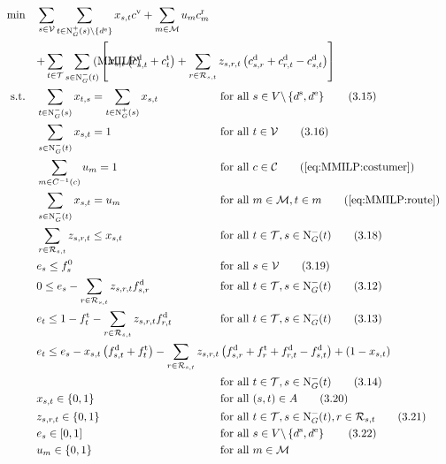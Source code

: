 \begin{align}
	\min \quad & \sum_{s\in\mathcal{V}} \sum_{t\in\Nout(s)\backslash\{d^{\operatorname{e}}\}} x_{s,t}\cv + \sum_{m\in\mathcal{M}} u_m \croute_m \nonumber \\
	& \omit\rlap{$\displaystyle{ + \sum_{t\in\mathcal{T}} \sum_{s\in\Nin(t)} \left[x_{s,t}\left(\cd_{s,t}+\ct_{t}\right) + \sum_{r\in\Rst} z_{s,r,t}\left(\cd_{s,r}+\cd_{r,t}-\cd_{s,t}\right)\right]}$} \tag{MMILP} \label{eq:MMILP} \\
	\text{s.t.} \quad & \sum_{t\in\Nin(s)} x_{t,s} = \sum_{t\in\Nout(s)} x_{s,t} & & \text{for all } s\in V\backslash\left\{d^{\operatorname{s}},d^{\operatorname{e}}\right\} \tag{3.15} \\
	& \sum_{s\in\Nin(t)} x_{s,t} = 1 & & \text{for all } t\in\mathcal{V} \tag{3.16} \\
	& \sum_{m\in C^{-1}(c)} u_m = 1 && \text{for all } c\in\mathcal{C} \tag{\ref{eq:MMILP:costumer}} \\
	& \sum_{s\in\Nin(t)} x_{s,t} = u_m && \text{for all } m\in\mathcal{M}, t\in m \tag{\ref{eq:MMILP:route}} \\
	& \sum_{r\in\Rst} z_{s,r,t} \leq x_{s,t} & & \text{for all } t\in\mathcal{T}, s\in\Nin(t) \tag{3.18} \\
	& e_s \leq f_s^0 & & \text{for all } s\in\mathcal{V} \tag{3.19} \\
	& 0 \leq e_s - \sum_{r\in\Rst} z_{s,r,t}\fd_{s,r} & & \text{for all } t\in\mathcal{T}, s\in\Nin(t) \tag{3.12} \\
	& e_t \leq 1 - \ft_t - \sum_{r\in\Rst} z_{s,r,t}\fd_{r,t} & & \text{for all } t\in\mathcal{T}, s\in\Nin(t) \tag{3.13} \\
	& \omit\rlap{$\displaystyle{e_t \leq e_s - x_{s,t}\left(f_{s,t}^{\operatorname{d}}+f_t^{\operatorname{t}}\right) - \sum_{r\in\Rst} z_{s,r,t}\left(\fd_{s,r}+\ft_r+\fd_{r,t}-\fd_{s,t}\right) + \left(1-x_{s,t}\right)}$} \nonumber \\
	& & & \text{for all } t\in\mathcal{T}, s\in\Nin(t) \tag{3.14} \\
	& x_{s,t}\in\{0,1\} & & \text{for all } (s,t)\in A \tag{3.20} \\
	& z_{s,r,t}\in\{0,1\} & & \text{for all } t\in\mathcal{T},s\in\Nin(t),r\in\Rst \tag{3.21} \\
	& e_s\in[0,1] & & \text{for all } s\in V\backslash\left\{d^{\operatorname{s}},d^{\operatorname{e}}\right\} \tag{3.22} \\
	& u_m\in\{0,1\} && \text{for all } m\in\mathcal{M}
\end{align}